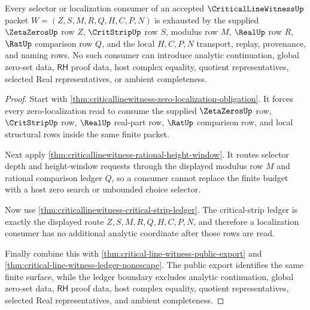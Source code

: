 \begin{theorem}
\label{thm:critical-line-witness-root-zero-localization-selector-exhaustion}
Every selector or localization consumer of an accepted $\CriticalLineWitnessUp$ packet $W=(Z,S,M,R,Q,H,C,P,N)$ is exhausted by the supplied $\ZetaZerosUp$ row $Z$, $\CritStripUp$ row $S$, modulus row $M$, $\RealUp$ row $R$, $\RatUp$ comparison row $Q$, and the local $H,C,P,N$ transport, replay, provenance, and naming rows. No such consumer can introduce analytic continuation, global zero-set data, $\mathsf{RH}$ proof data, host complex equality, quotient representatives, selected Real representatives, or ambient completeness.
\end{theorem}
\begin{proof}
Start with \autoref{thm:criticallinewitness-zero-localization-obligation}. It forces every zero-localization read to consume the supplied $\ZetaZerosUp$ row, $\CritStripUp$ row, $\RealUp$ real-part row, $\RatUp$ comparison row, and local structural rows inside the same finite packet.

Next apply \autoref{thm:criticallinewitness-rational-height-window}. It routes selector depth and height-window requests through the displayed modulus row $M$ and rational comparison ledger $Q$, so a consumer cannot replace the finite budget with a host zero search or unbounded choice selector.

Now use \autoref{thm:criticallinewitness-critical-strip-ledger}. The critical-strip ledger is exactly the displayed route $Z,S,M,R,Q,H,C,P,N$, and therefore a localization consumer has no additional analytic coordinate after those rows are read.

Finally combine this with \autoref{thm:critical-line-witness-public-export} and \autoref{thm:critical-line-witness-ledger-nonescape}. The public export identifies the same finite surface, while the ledger boundary excludes analytic continuation, global zero-set data, $\mathsf{RH}$ proof data, host complex equality, quotient representatives, selected Real representatives, and ambient completeness.
\end{proof}

